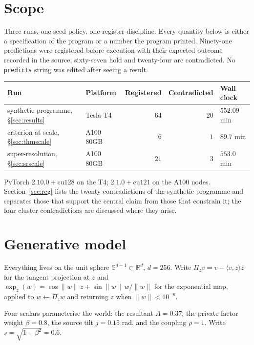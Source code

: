 \documentclass[11pt]{article}
\newcommand{\R}{\mathbb{R}}
\newcommand{\Sph}{\mathbb{S}}
\begin{document}
\section{Scope}

Three runs, one seed policy, one register discipline. Every quantity below is either a
specification of the program or a number the program printed. Ninety-one predictions were
registered before execution with their expected outcome recorded in the source; sixty-seven hold
and twenty-four are contradicted. No \texttt{predicts} string was edited after seeing a result.

\begin{center}
\begin{tabular}{@{}llrrl@{}}
\toprule
Run & Platform & Registered & Contradicted & Wall clock\\
\midrule
synthetic programme, \S\ref{sec:results} & Tesla T4 & $64$ & $20$ & $552.09$ min\\
criterion at scale, \S\ref{sec:thmscale} & A100 80GB & $6$ & $1$ & $89.7$ min\\
super-resolution, \S\ref{sec:srscale} & A100 80GB & $21$ & $3$ & $553.0$ min\\
\bottomrule
\end{tabular}
\end{center}

PyTorch $2.10.0{+}\mathrm{cu}128$ on the T4; $2.1.0{+}\mathrm{cu}121$ on the A100 nodes.
Section~\ref{sec:reg} lists the twenty contradictions of the synthetic programme and separates
those that support the central claim from those that constrain it; the four cluster
contradictions are discussed where they arise.

\section{Generative model}

Everything lives on the unit sphere $\Sph^{d-1}\subset\R^{d}$, $d=256$. Write
$\Pi_z v=v-\langle v,z\rangle z$ for the tangent projection at $z$ and
$\exp_z(w)=\cos\|w\|\,z+\sin\|w\|\,w/\|w\|$ for the exponential map, applied to $w\leftarrow\Pi_zw$
and returning $z$ when $\|w\|<10^{-6}$.

Four scalars parameterise the world: the resultant $A=0.37$, the private-factor weight
$\beta=0.8$, the source tilt $j=0.15$ rad, and the coupling $\rho=1$. Write $s=\sqrt{1-\beta^2}=0.6$.
\end{document}
